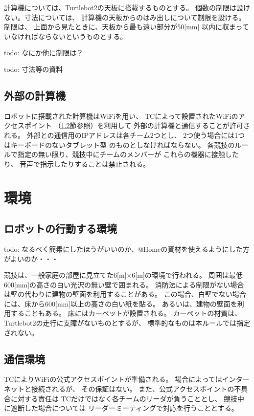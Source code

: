 \documentclass[a4j]{jarticle}
\begin{document}
計算機については、Turtlebot2の天板に搭載するものとする。
個数の制限は設けない。寸法については、
計算機の天板からのはみ出しについて制限を設ける。
制限は、
上面から見たときに、天板から最も遠い部分が50[mm]
以内に収まっていなければならないというものとする。

todo: なにか他に制限は？

todo: 寸法等の資料

\subsection{外部の計算機}

ロボットに搭載された計算機はWiFiを用い、
TCによって設置されたWiFiのアクセスポイント
（\ref{sub:network}節参照）を利用して
外部の計算機と通信することが許可される。
外部との通信用のIPアドレスは各チーム2つとし、
2つ使う場合には1つはキーボードのないタブレット型
のものとしなければならない。
各競技のルールで指定の無い限り、競技中にチームのメンバーが
これらの機器に接触したり、
音声で指示したりすることは禁止される。


\section{環境}

\subsection{ロボットの行動する環境}

todo: なるべく簡素にしたほうがいいのか、@Homeの資材を使えるようにした方がよいのか・・・

競技は、一般家庭の部屋に見立てた6[m]$\times$6[m]の環境で行われる。
周囲は最低600[mm]の高さの白い光沢の無い壁で囲まれる。
消防法による制限がない場合は壁の代わりに建物の壁面を利用することがある。
この場合、白壁でない場合には、床から600[mm]以上の高さの白い紙を貼る。
あるいは、建物の壁面を利用することもある。
床にはカーペットが設置される。
カーペットの材質は、Turtlebot2の走行に支障がないものとするが、
標準的なものは本ルールでは指定されない。

\subsection{通信環境}\label{sub:network}

TCによりWiFiの公式アクセスポイントが準備される。
場合によってはインターネットと接続されるが、
その保証はない。
また、公式アクセスポイントの不具合に対する責任は
TCだけではなく各チームのリーダが負うこととし、
競技中に遮断した場合については
リーダーミーティングで対応を行うこととする。
\end{document}

